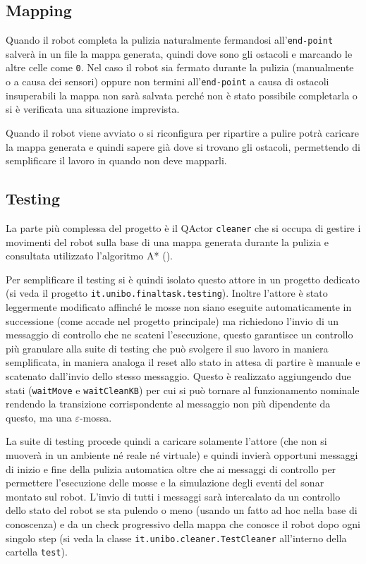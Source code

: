 \subsection{Mapping}
Quando il robot completa la pulizia naturalmente fermandosi all'\texttt{end-point} salverà in un file la mappa generata, quindi dove sono gli ostacoli e marcando le altre celle come \texttt{0}. Nel caso il robot sia fermato durante la pulizia (manualmente o a causa dei sensori) oppure non termini all'\texttt{end-point} a causa di ostacoli insuperabili la mappa non sarà salvata perché non è stato possibile completarla o si è verificata una situazione imprevista.

Quando il robot viene avviato o si riconfigura per ripartire a pulire potrà caricare la mappa generata e quindi sapere già dove si trovano gli ostacoli, permettendo di semplificare il lavoro in quando non deve mapparli.

\subsection{Testing}
La parte più complessa del progetto è il QActor \texttt{cleaner} che si occupa di gestire i movimenti del robot sulla base di una mappa generata durante la pulizia e consultata utilizzato l'algoritmo A* ().

Per semplificare il testing si è quindi isolato questo attore in un progetto dedicato (si veda il progetto \texttt{it.unibo.finaltask.testing}). Inoltre l'attore è stato leggermente modificato affinché le mosse non siano eseguite automaticamente in successione (come accade nel progetto principale) ma richiedono l'invio di un messaggio di controllo che ne scateni l'esecuzione, questo garantisce un controllo più granulare alla suite di testing che può svolgere il suo lavoro in maniera semplificata, in maniera analoga il reset allo stato in attesa di partire è manuale e scatenato dall'invio dello stesso messaggio. Questo è realizzato aggiungendo due stati (\texttt{waitMove} e \texttt{waitCleanKB}) per cui si può tornare al funzionamento nominale rendendo la transizione corrispondente al messaggio non più dipendente da questo, ma una $\varepsilon$-mossa.

La suite di testing procede quindi a caricare solamente l'attore (che non si muoverà in un ambiente né reale né virtuale) e quindi invierà opportuni messaggi di inizio e fine della pulizia automatica oltre che ai messaggi di controllo per permettere l'esecuzione delle mosse e la simulazione degli eventi del sonar montato sul robot. L'invio di tutti i messaggi sarà intercalato da un controllo dello stato del robot se sta pulendo o meno (usando un fatto ad hoc nella base di conoscenza) e da un check progressivo della mappa che conosce il robot dopo ogni singolo step (si veda la classe \texttt{it.unibo.cleaner.TestCleaner} all'interno della cartella \texttt{test}).

